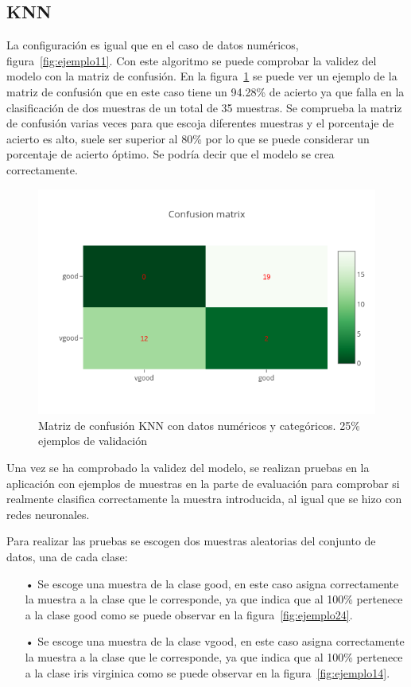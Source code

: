 \documentclass[a4paper, 12pt]{book}
\begin{document}
\subsection{KNN}
\label{subsec:knn}

La configuración es igual que en el caso de datos numéricos, figura~\ref{fig:ejemplo11}. Con este algoritmo se puede comprobar la validez del modelo con la matriz de confusión. En la figura~\ref{fig:ejemplo23} se puede ver un ejemplo de la matriz de confusión que en este caso tiene un 94.28\% de acierto ya que falla en la clasificación de dos muestras de un total de 35 muestras. Se comprueba la matriz de confusión varias veces para que escoja diferentes muestras y el porcentaje de acierto es alto, suele ser superior al 80\% por lo que se puede considerar un porcentaje de acierto óptimo. Se podría decir que el modelo se crea correctamente.

\begin{figure}
	\centering
	\includegraphics[width=12cm, keepaspectratio]{img/cm_numycat_knn.png}
	\caption{Matriz de confusión KNN con datos numéricos y categóricos. 25\% ejemplos de validación} 	
	\label{fig:ejemplo23}
\end{figure}

Una vez se ha comprobado la validez del modelo, se realizan pruebas en la aplicación con ejemplos de muestras en la parte de evaluación para comprobar si realmente clasifica correctamente la muestra introducida, al igual que se hizo con redes neuronales.

Para realizar las pruebas se escogen dos muestras aleatorias del conjunto de datos, una de cada clase:

\begin{itemize}
\item[•] Se escoge una muestra de la clase good, en este caso asigna correctamente la muestra a la clase que le corresponde, ya que indica que al 100\% pertenece a la clase good como se puede observar en la figura~\ref{fig:ejemplo24}.
\item[•] Se escoge una muestra de la clase vgood, en este caso asigna correctamente la muestra a la clase que le corresponde, ya que indica que al 100\% pertenece a la clase iris virginica como se puede observar en la figura~\ref{fig:ejemplo14}.
\end{itemize}
\end{document}
